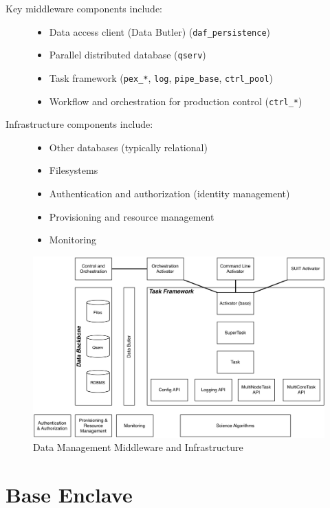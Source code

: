 \documentclass[DM,lsstdraft,toc]{lsstdoc}
\begin{document}
\begin{description}
\item[Key middleware components include:]
\begin{itemize}
\tightlist
\item
  Data access client (Data Butler) (\texttt{daf\_persistence})
\item
  Parallel distributed database (\texttt{qserv})
\item
  Task framework (\texttt{pex\_*}, \texttt{log}, \texttt{pipe\_base},
  \texttt{ctrl\_pool})
\item
  Workflow and orchestration for production control (\texttt{ctrl\_*})
\end{itemize}
\item[Infrastructure components include:]
\begin{itemize}
\tightlist
\item
  Other databases (typically relational)
\item
  Filesystems
\item
  Authentication and authorization (identity management)
\item
  Provisioning and resource management
\item
  Monitoring
\end{itemize}
\end{description}

\begin{figure}
\centering
\includegraphics{DM_Middleware_and_Infrastructure.png}
\caption{Data Management Middleware and Infrastructure}
\end{figure}

\section{Base Enclave}\label{base-enclave}
\end{document}
